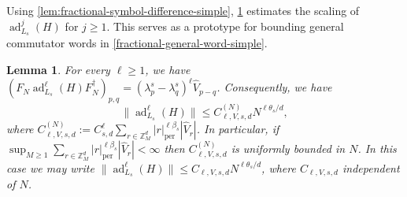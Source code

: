 \documentclass[10pt,reqno]{article}
\numberwithin{equation}{section}
\theoremstyle{plain}
\newtheorem{lem}[thm]{Lemma}
\theoremstyle{definition}
\begin{document}
Using \cref{lem:fractional-symbol-difference-simple}, \cref{lem:canonical-fractional-commutator-simple} estimates the scaling of \(\operatorname{ad}_{L_s}^j(H)\) for \(j\geq1\). This serves as a prototype for bounding general commutator words in \cref{fractional-general-word-simple}.

\begin{lem}\label{lem:canonical-fractional-commutator-simple}
For every \(\ell\geq1\), we have $(F_N\operatorname{ad}_{L_s}^\ell(H)F_N^\dagger)_{p,q} = (\lambda_p^s-\lambda_q^s)^\ell \widehat V_{p-q}$.  Consequently, we have
\begin{equation}\label{eq:canonical-adLsH-bound}
\|\operatorname{ad}_{L_s}^\ell(H)\| \leq C_{\ell,V,s,d}^{(N)} N^{\ell\theta_s/d},
\end{equation}
where $C^{(N)}_{\ell,V,s,d}  :=    C_{s,d}^\ell   \sum_{r \in \mathbb Z^d_M} |r|_{\operatorname{per}}^{\ell\beta_s}  |\widehat V_r|$. In particular, if $\sup_{M\geq 1} \sum_{r\in\mathbb Z_M^d} |r|_{\operatorname{per}}^{\ell\beta_s}|\widehat V_r|<\infty$ then \(C_{\ell,V,s,d}^{(N)}\) is uniformly bounded in \(N\). In this case we may write $\|\operatorname{ad}_{L_s}^\ell(H)\| \leq C_{\ell,V,s,d} N^{\ell\theta_s/d}$, 
where \(C_{\ell,V,s,d}\) independent of $N$.
\end{lem}
\end{document}
